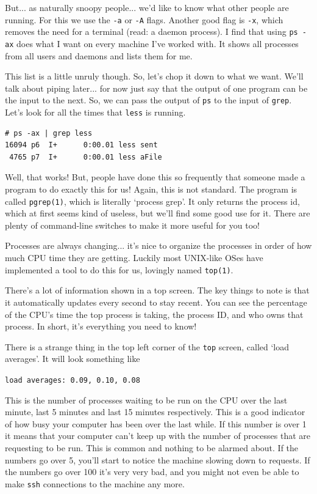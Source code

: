 But... as naturally snoopy people... we'd like to know what other people are running.
For this we use the {\tt -a} or {\tt -A} flags. Another good flag is {\tt -x}, which 
removes the need for a terminal (read: a daemon process). I find that using {\tt ps -ax} 
does what I want on every machine I've worked with. It shows all processes from all users
and daemons and lists them for me. 

This list is a little unruly though. So, let's chop it down to what we want. 
We'll talk about piping later...
 for now just say that the output 
of one program can be the input to the next. So, we can pass the output of 
{\tt ps} to the input of {\tt grep}. Let's look for all the times that {\tt less}
is running.
{\begin{verbatim}
# ps -ax | grep less
16094 p6  I+      0:00.01 less sent
 4765 p7  I+      0:00.01 less aFile
\end{verbatim}
}

Well, that works! But, people have done this so frequently that someone made a program
to do exactly this for us! Again, this is not standard. The program is called {\tt pgrep(1)},
which is literally `process grep'. It only returns the process id, which at first seems kind of useless,
but we'll find some good use for it. There are plenty of command-line switches to make it 
more useful for you too!

Processes are always changing... it's nice to organize the processes in order 
of how much CPU time they are getting. Luckily most UNIX-like OSes have implemented a
tool to do this for us, lovingly named {\tt top(1)}.


There's a lot of information shown in a top screen. The key things to note is that
it automatically updates every second to stay recent. You can see the 
percentage of the CPU's time the top process is taking, the process ID, and who owns that process.
In short, it's everything you need to know!

There is a strange thing in the top left corner of the {\tt top} screen, called `load averages'.
It will look something like

{\tt load averages: 0.09, 0.10, 0.08}

This is the number of processes waiting to be run on the CPU over the last minute, last 5 minutes and last 15 minutes respectively.
This is a good indicator of how busy your computer has been over the last while. If this number is over 1 it means that your computer
can't keep up with the number of processes that are requesting to be run. This is common and nothing to be alarmed about. If the 
numbers go over 5, you'll start to notice the machine slowing down to requests. If the numbers go over 100 it's very
very bad, and you might not even be able to make {\tt ssh} connections to the machine any more.

